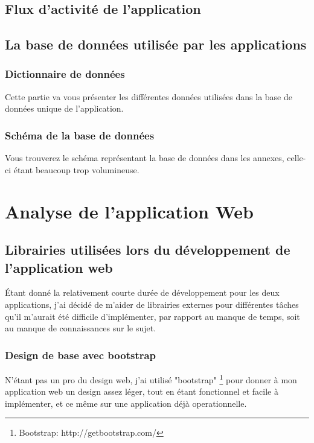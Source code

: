 \documentclass[12pt,table,a4paper]{report}
\begin{document}
\subsection{Flux d'activité de l'application}


\subsection{La base de données utilisée par les applications}

\subsubsection{Dictionnaire de données}
Cette partie va vous présenter les différentes données utilisées dans la base de données unique de l'application.

\subsubsection{Schéma de la base de données}
Vous trouverez le schéma représentant la base de données dans les annexes, celle-ci étant beaucoup trop volumineuse.

\section{Analyse de l'application Web}

\subsection{Librairies utilisées lors du développement de l'application web}
Étant donné la relativement courte durée de développement pour les deux applications, j'ai décidé de m'aider de librairies externes pour différentes tâches qu'il m'aurait été difficile d'implémenter, par rapport au manque de temps, soit au manque de connaissances sur le sujet.

\subsubsection{Design de base avec bootstrap}
N'étant pas un pro du design web, j'ai utilisé "bootstrap" \footnote{Bootstrap: http://getbootstrap.com/} pour donner à mon application web un design assez léger, tout en étant fonctionnel et facile à implémenter, et ce même sur une application déjà operationnelle.
\end{document}

